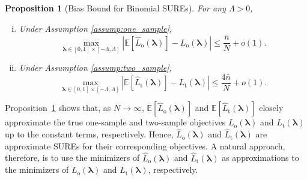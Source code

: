 \documentclass[12pt,letterpaper]{article}
\newtheorem{proposition}{Proposition}[section]
\begin{document}
\begin{proposition}[Bias Bound for Binomial SUREs]\label{prop:approximate:sure}
For any $\Lambda>0$,
~\begin{enumerate}[(i)]
\item Under Assumption \ref{assump:one_sample}, 
\[\max_{\boldsymbol{\lambda}\in[0,1]\times[-\Lambda,\Lambda]}\left|\mathbb{E}[\hat{L}_{\mathrm{o}}(\boldsymbol{\lambda})]-L_{\mathrm{o}}(\boldsymbol{\lambda})\right|\le \frac{\bar{n}}{N} + o(1).\]
\item Under Assumption \ref{assump:two_sample}, 
\[\max_{\boldsymbol{\lambda}\in[0,1]\times[-\Lambda,\Lambda]}\left|\mathbb{E}[\hat{L}_{\mathrm{t}}(\boldsymbol{\lambda})]-L_{\mathrm{t}}(\boldsymbol{\lambda})\right|\le \frac{4\bar{n}}{N} + o(1).\]
\end{enumerate}
\end{proposition}
Proposition~\ref{prop:approximate:sure} shows that, as $N\rightarrow \infty$, $\mathbb{E}[\hat{L}_{\mathrm{o}}(\boldsymbol{\lambda})]$ and $\mathbb{E}[\hat{L}_{\mathrm{t}}(\boldsymbol{\lambda})]$ closely approximate the true one-sample and two-sample objectives $L_{\mathrm{o}}(\boldsymbol{\lambda})$ and $L_{\mathrm{t}}(\boldsymbol{\lambda})$ up to the constant terms, respectively. Hence, $\hat{L}_{\mathrm{o}}(\boldsymbol{\lambda})$ and $\hat{L}_{\mathrm{t}}(\boldsymbol{\lambda})$ are approximate SUREs for their corresponding objectives. A natural approach, therefore, is to use the minimizers of $\hat{L}_{\mathrm{o}}(\boldsymbol{\lambda})$ and $\hat{L}_{\mathrm{t}}(\boldsymbol{\lambda})$ as approximations to the minimizers of $L_{\mathrm{o}}(\boldsymbol{\lambda})$ and $L_{\mathrm{t}}(\boldsymbol{\lambda})$, respectively. 

\end{document}

